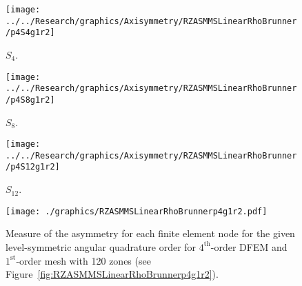 \documentclass[12pt,letterpaper]{article}
\begin{document}
\begin{sidewaysfigure}[!htb]
\centering
\begin{subfigure}{0.33\textwidth}
\texttt{[image: ../../Research/graphics/Axisymmetry/RZASMMSLinearRhoBrunner/p4S4g1r2]}
\caption{$S_4$.}
\end{subfigure}%
\begin{subfigure}{0.33\textwidth}
\texttt{[image: ../../Research/graphics/Axisymmetry/RZASMMSLinearRhoBrunner/p4S8g1r2]}
\caption{$S_8$.}
\end{subfigure}%
\begin{subfigure}{0.33\textwidth}
\texttt{[image: ../../Research/graphics/Axisymmetry/RZASMMSLinearRhoBrunner/p4S12g1r2]}
\caption{$S_{12}$.}
\end{subfigure}
\caption{Relative asymmetry for $4^\text{st}$-order finite elements on a $1^\text{st}$-order mesh for given order of level-symmetric angular quadrature.}
\label{fig:RZASMMSLinearRhoBrunnerp4g1r2}
\end{sidewaysfigure}

\begin{figure}[!htb]
\centering
\texttt{[image: ./graphics/RZASMMSLinearRhoBrunnerp4g1r2.pdf]}
\caption{Measure of the asymmetry for each finite element node for the given level-symmetric angular quadrature order for $4^\text{th}$-order DFEM and $1^\text{st}$-order mesh with 120 zones (see Figure~\ref{fig:RZASMMSLinearRhoBrunnerp4g1r2}).}
\label{fig:RZASMMSLinearRhoBrunnerp4g1r2Nodes}
\end{figure}
\end{document}
